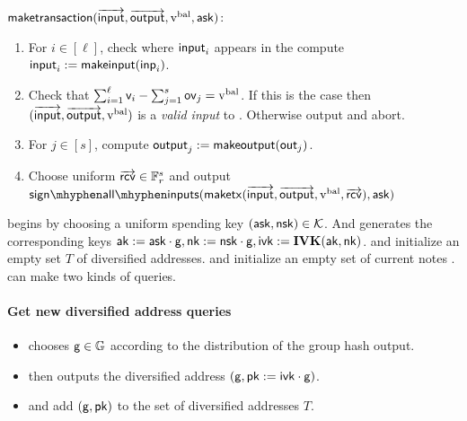 \documentclass[11pt]{article}
\numberwithin{equation}{section} %
\numberwithin{figure}{section} %
\newcommand{\inp}{\ensuremath{\mathsf{inp}}\xspace}
\newcommand{\out}{\ensuremath{\mathsf{out}}\xspace}
\begin{document}
\underline{$\mathsf{maketransaction}(\overrightarrow{\mathsf{input}},\overrightarrow{\mathsf{output}},\mathrm{v^{bal}},\mathsf{ask})$}:
\begin{enumerate}
 \item For $i\in [\ell]$, check where $\mathsf{input}_i$ appears in the compute $\input_i\defeq \makeinput({{\inp}}_i)$.
\item Check that $\sum_{i=1}^\ell \mathsf{v}_i - \sum_{j=1}^s \mathsf{ov}_j=\mathrm{v^{bal}}$.
If this is the case then $(\overrightarrow{\mathsf{input}},\overrightarrow{\mathsf{output}},\mathrm{v^{bal}})$ is a \emph{valid input} to \maketransaction.
Otherwise output \rej and abort.
 \item For $j\in [s]$, compute $\output_j \defeq \makeoutput({\out_j})$.
 \item Choose uniform $\overrightarrow{\mathsf{rcv}}\in {\mathbb F}_r^s$ and output $\signallinputs(\maketx{(\inputs,\outputs,\vbal,\rcvs)},\ask)$
 
\end{enumerate}

\oracle begins by choosing a uniform spending key $(\mathsf{ask},\mathsf{nsk})\in{\mathcal K}$.
And generates the corresponding keys $\mathsf{ak}:= \mathsf{ask}\cdot \mathsf{g} ,\mathsf{nk}:= \mathsf{nsk}\cdot\mathsf{g}, \mathsf{ivk} :=\mathbf{IVK}(\mathsf{ak},\mathsf{nk})$. 
\adv and \oracle initialize an empty set $T$ of diversified addresses.
 \adv and \oracle initialize an empty set of current notes \curnotes. 
\adv can make two kinds of queries.

\paragraph{Get new diversified address queries}
\begin{itemize}
\item\oracle chooses $\mathsf{g}\in \mathbb{G}$ according to the distribution \GH of the group hash output.
\item\oracle then outputs the diversified address $(\mathsf{g},\mathsf{pk} := \mathsf{ivk}\cdot \mathsf{g})$.
\item \adv and \oracle add $(\mathsf{g},\mathsf{pk})$ to the set of diversified addresses $T$.
\end{itemize}
\end{document}
